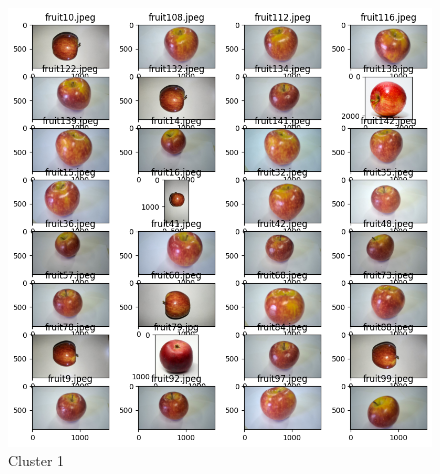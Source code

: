 \documentclass[a4paper, 12pt]{article}
\begin{document}
\begin{figure}[!htbp]
\begin{minipage}[t]{0.5\textwidth}
        \includegraphics[width=0.8\linewidth]{cluster1.png}
        \caption{Cluster 1}
        \label{cluster1}
    \end{minipage}
\end{figure}
\end{document}
